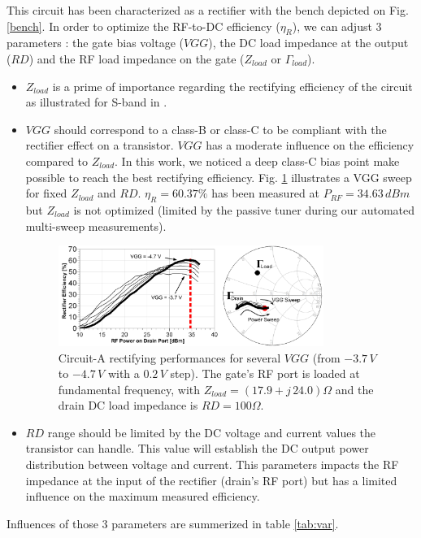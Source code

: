 \documentclass[conference]{IEEEtran}
\begin{document}
This circuit has been characterized as a rectifier with the bench depicted on Fig. \ref{bench}. In order to optimize the RF-to-DC efficiency ($\eta_R$), we can adjust 3 parameters : the gate bias voltage ($VGG$), the DC load impedance at the output ($RD$) and the RF load impedance on the gate ($Z_{load}$ or $\Gamma_{load}$). \\

\begin{itemize}
	\item {$Z_{load}$ is a prime of importance regarding the rectifying efficiency of the circuit as illustrated for S-band in \cite{Reveyrand2012}.\\}
		
	\item {$VGG$ should correspond to a class-B or class-C to be compliant with the rectifier effect on a transistor. $VGG$ has a moderate influence on the efficiency compared to $Z_{load}$. In this work, we noticed a deep class-C bias point make possible to reach the best rectifying efficiency. Fig. \ref{mike_rect_mVGG} illustrates a VGG sweep for fixed $Z_{load}$ and $RD$. $\eta_R=60.37\%$ has been measured at $P_{RF}=34.63\,dBm$ but $Z_{load}$ is not optimized (limited by the passive tuner during our automated multi-sweep measurements).}

\begin{figure}[ht!] %
\centering
\includegraphics[width=3.4in]{IMS2014_Mike_Rectifier_mVGG.pdf}
\caption{ Circuit-A rectifying performances for several $VGG$ (from $-3.7\,V$ to $-4.7\,V$ with a $0.2\,V$ step). The gate's RF port is loaded at fundamental frequency, with $Z_{load}=(17.9+j\,24.0)\Omega$ and the drain DC load impedance is $RD=100\Omega$.}
\label{mike_rect_mVGG}
\end{figure}

	\item {$RD$ range should be limited by the DC voltage and current values the transistor can handle. This value will establish the DC output power distribution between voltage and current. This parameters impacts the RF impedance at the input of the rectifier (drain's RF port) but has a limited influence on the maximum measured efficiency.}
\end{itemize}
Influences of those 3 parameters are summerized in table \ref{tab:var}.
\end{document}
